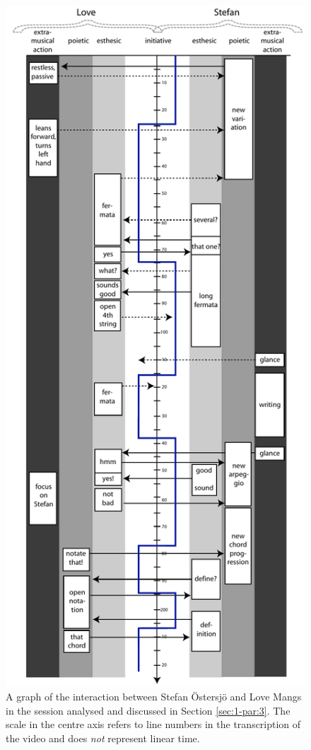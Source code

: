    \begin{figure}[ht]
    \begin{center}
       \includegraphics[height=0.85\textheight]{img/timeline_horiz}
    \end{center}
    \caption[A graph of the interaction between Stefan \"{O}stersj\"{o} and Love Mangs.]{A graph of the interaction between Stefan \"{O}stersj\"{o} and Love Mangs in the session analysed and discussed in Section \ref{sec:1-par:3}. The scale in the centre axis refers to line numbers in the transcription of the video and does \emph{not} represent linear time.}
    \label{fig:timeline-mangs}
   \end{figure}


